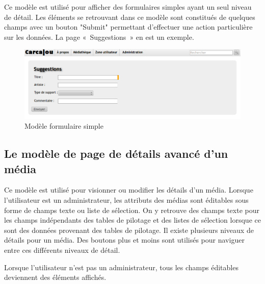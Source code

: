 \documentclass[letter, 11pt]{report}
\begin{document}
Ce modèle est utilisé pour afficher des formulaires simples ayant un seul niveau de détail. Les éléments se retrouvant dans ce modèle sont constitués de quelques champs avec un bouton "Submit" permettant d'effectuer une action particulière sur les données. La page «~Suggestions~» en est un exemple.

\begin{figure}[htbp]
	\begin{center}
		\includegraphics[scale=0.4]{captures_ecran/modele_formulaire_simple.png}
	\end{center}
	\caption{Modèle formulaire simple}
\end{figure}

\subsection{Le modèle de page de détails avancé d'un média}

Ce modèle est utilisé pour visionner ou modifier les détails d'un média. Lorsque l'utilisateur est un administrateur, les attributs des médias sont éditables sous forme de champs texte ou liste de sélection. On y retrouve des champs texte pour les champs indépendants des tables de pilotage et des listes de sélection lorsque ce sont des données provenant des tables de pilotage. Il existe plusieurs niveaux de détails pour un média. Des boutons plus et moins sont utilisés pour naviguer entre ces différents niveaux de détail.

Lorsque l'utilisateur n'est pas un administrateur, tous les champs éditables deviennent des éléments affichés.
\end{document}
